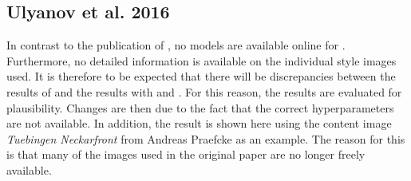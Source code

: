 \subsection{Ulyanov et al. 2016} \label{sec:ulyanov_2016}
In contrast to the publication of , no models are available online for . Furthermore, no detailed information is available on the individual style images used. It is therefore to be expected that there will be discrepancies between the results of  and the results with \paper{} and \implementation{}. For this reason, the results are evaluated for plausibility. Changes are then due to the fact that the correct hyperparameters are not available. In addition, the result is shown here using the content image \emph{Tuebingen Neckarfront} from Andreas Praefcke as an example. The reason for this is that many of the images used in the original paper are no longer freely available.

